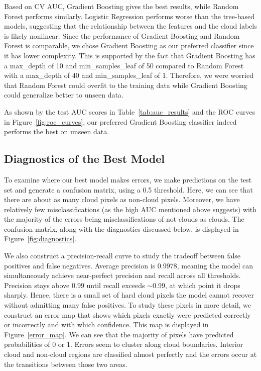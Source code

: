 \documentclass[10pt,letterpaper]{article}
\begin{document}
Based on CV AUC, Gradient Boosting gives the best results, while Random Forest performs similarly. Logistic Regression performs worse than the tree-based models, suggesting that the relationship between the features and the cloud labels is likely nonlinear. Since the performance of Gradient Boosting and Random Forest is comparable, we chose Gradient Boosting as our preferred classifier since it has lower complexity. This is supported by the fact that Gradient Boosting has a max\_depth of 10 and min\_samples\_leaf of 50 compared to Random Forest with a max\_depth of 40 and min\_samples\_leaf of 1. Therefore, we were worried that Random Forest could overfit to the training data while Gradient Boosting could generalize better to unseen data.

As shown by the test AUC scores in Table~\ref{tab:auc_results} and the ROC curves in Figure~\ref{fig:roc_curves}, our preferred Gradient Boosting classifier indeed performs the best on unseen data.

\subsection{Diagnostics of the Best Model}

To examine where our best model makes errors, we make predictions on the test set and generate a confusion matrix, using a 0.5 threshold. Here, we can see that there are about as many cloud pixels as non-cloud pixels. Moreover, we have relatively few misclassifications (as the high AUC mentioned above suggests) with the majority of the errors being misclassifications of not clouds as clouds. The confusion matrix, along with the diagnostics discussed below, is displayed in Figure~\ref{fig:diagnostics}.

We also construct a precision-recall curve to study the tradeoff between false positives and false negatives. Average precision is 0.9978, meaning the model can simultaneously achieve near-perfect precision and recall across all thresholds. Precision stays above 0.99 until recall exceeds $\sim$0.99, at which point it drops sharply. Hence, there is a small set of hard cloud pixels the model cannot recover without admitting many false positives. To study these pixels in more detail, we construct an error map that shows which pixels exactly were predicted correctly or incorrectly and with which confidence. This map is displayed in Figure~\ref{error_map}. We can see that the majority of pixels have predicted probabilities of 0 or 1. Errors seem to cluster along cloud boundaries. Interior cloud and non-cloud regions are classified almost perfectly and the errors occur at the transitions between those two areas.
\end{document}
